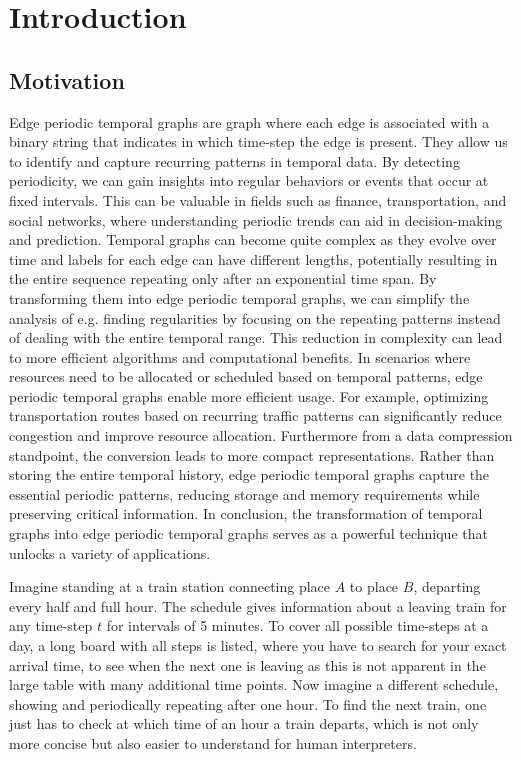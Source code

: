 \chapter{Introduction}
\label{ch:Introduction}
\section{Motivation}
\label{ch:Introduction:sec:Motivation}
Edge periodic temporal graphs are graph where each edge is associated with a binary string that indicates in which time-step the edge is present.
They allow us to identify and capture recurring patterns in temporal data.
By detecting periodicity, we can gain insights into regular behaviors or events that occur at fixed intervals.
This can be valuable in fields such as finance, transportation, and social networks, where understanding periodic trends can aid in decision-making and prediction.
Temporal graphs can become quite complex as they evolve over time and labels for each edge can have different lengths, potentially resulting in the entire sequence repeating only after an exponential time span.
By transforming them into edge periodic temporal graphs, we can simplify the analysis of e.g. finding regularities by focusing on the repeating patterns instead of dealing with the entire temporal range.
This reduction in complexity can lead to more efficient algorithms and computational benefits.
In scenarios where resources need to be allocated or scheduled based on temporal patterns, edge periodic temporal graphs enable more efficient usage.
For example, optimizing transportation routes based on recurring traffic patterns can significantly reduce congestion and improve resource allocation.
Furthermore from a data compression standpoint, the conversion leads to more compact representations.
Rather than storing the entire temporal history, edge periodic temporal graphs capture the essential periodic patterns, reducing storage and memory requirements while preserving critical information.
In conclusion, the transformation of temporal graphs into edge periodic temporal graphs serves as a powerful technique that unlocks a variety of applications.

Imagine standing at a train station connecting place $A$ to place $B$, departing every half and full hour.
The schedule gives information about a leaving train for any time-step $t$ for intervals of 5 minutes.
To cover all possible time-steps at a day, a long board with all steps is listed, where you have to search for your exact arrival time, to see when the next one is leaving as this is not apparent in the large table with many additional time points.
Now imagine a different schedule, showing and periodically repeating after one hour.
To find the next train, one just has to check at which time of an hour a train departs, which is not only more concise but also easier to understand for human interpreters.
